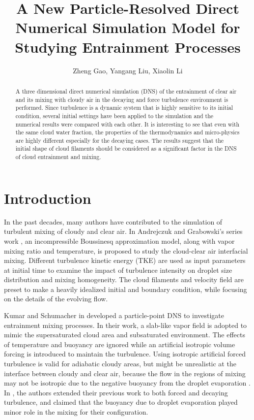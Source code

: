 \documentclass[12pt]{article}
\begin{document}
\title{A New Particle-Resolved Direct Numerical Simulation Model for Studying Entrainment Processes}
\author{Zheng Gao,
Yangang Liu,
Xiaolin Li}
\maketitle


\begin{abstract}
A three dimensional direct numerical simulation (DNS) of the entrainment 
of clear air and its mixing with cloudy air in the decaying and force 
turbulence environment is performed. Since turbulence is a dynamic system 
that is highly sensitive to its initial condition, several initial settings 
have been applied to the simulation and the numerical results were compared 
with each other. It is interesting to see that even with the same cloud 
water fraction, the properties of the thermodynamics and micro-physics are 
highly different especially for the decaying cases. 
The results suggest that the initial shape of cloud filaments should be 
considered as a significant factor in the DNS of cloud entrainment and mixing.   
\end{abstract}

\section{Introduction}
In the past decades, many authors have contributed to the simulation of
turbulent mixing of cloudy and clear air. In Andrejczuk and Grabowski's series work \cite{And04,And06,And09}, an incompressible Boussinesq approximation model, along with vapor mixing ratio and temperature, is proposed to study the cloud-clear air interfacial mixing. Different turbulence kinetic energy (TKE) are used as input parameters at initial time to examine the impact of turbulence intensity on droplet size distribution and mixing homogeneity. The cloud filaments and velocity field are preset to make a heavily idealized initial and boundary condition, while focusing on the details of the evolving flow. 

Kumar and Schumacher in \cite{Kumar11,Kumar12} developed a particle-point DNS to investigate entrainment mixing processes. In their work, a slab-like vapor field is adopted to mimic the supersaturated cloud area and subsaturated environment. The effects of temperature and buoyancy are ignored while an artificial isotropic volume forcing is introduced to maintain the turbulence. Using isotropic artificial forced turbulence is valid for adiabatic cloudy areas, but might be unrealistic at the interface between cloudy and clear air, because the flow in the regions of mixing may not be isotropic due to the negative buoyancy from the droplet evaporation \cite{Vaillancourt00}. In \cite{Kumar14}, the authors extended their previous work to both forced and decaying turbulence, and claimed that the buoyancy due to droplet evaporation played minor role in the mixing for their configuration.
\end{document}

